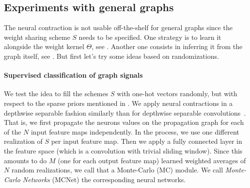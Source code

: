 



\subsection{Experiments with general graphs}
\label{sec:gsexp}

The neural contraction is not usable off-the-shelf for general graphs since the weight sharing scheme $S$ needs to be specified. One strategy is to learn it alongside the weight kernel $\Theta$, see . Another one consists in inferring it from the graph itself, see . But first let's try some ideas based on randomizations.

\paragraph{Supervised classification of graph signals}

We test the idea to fill the schemes $S$ with one-hot vectors randomly, but with respect to the sparse priors mentioned in . We apply neural contractions in a depthwise separable fashion similarly than for depthwise separable convolutions~\citep{chollet2016xception}. That is, we first propagate the neurons values on the propagation graph for each of the $N$ input feature maps independently. In the process, we use one different realization of $S$ per input feature map. Then we apply a fully connected layer in the feature space (which is a convolution with trivial sliding window). Since this amounts to do $M$ (one for each output feature map) learned weighted averages of $N$ random realizations, we call that a Monte-Carlo (MC) module. We call \emph{Monte-Carlo Networks} (MCNet) the corresponding neural networks.

